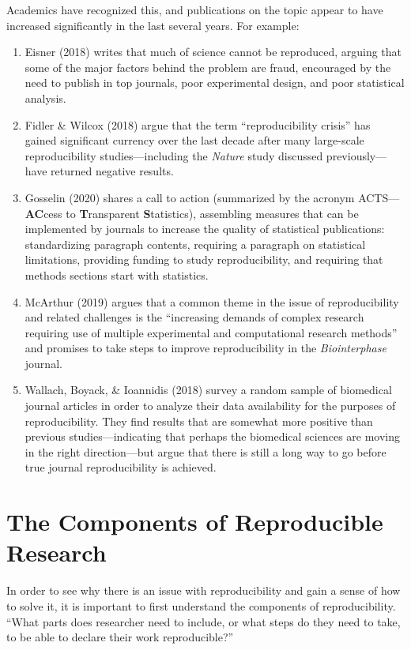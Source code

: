 \documentclass[12pt,twoside]{reedthesis}
\begin{document}
Academics have recognized this, and publications on the topic appear to have increased significantly in the last several years. For example:
\begin{enumerate}
\def\labelenumi{\arabic{enumi}.}
\item
  Eisner (2018) writes that much of science cannot be reproduced, arguing that some of the major factors behind the problem are fraud, encouraged by the need to publish in top journals, poor experimental design, and poor statistical analysis.
\item
  Fidler \& Wilcox (2018) argue that the term ``reproducibility crisis'' has gained significant currency over the last decade after many large-scale reproducibility studies---including the \emph{Nature} study discussed previously---have returned negative results.
\item
  Gosselin (2020) shares a call to action (summarized by the acronym ACTS---\textbf{AC}cess to \textbf{T}ransparent \textbf{S}tatistics), assembling measures that can be implemented by journals to increase the quality of statistical publications: standardizing paragraph contents, requiring a paragraph on statistical limitations, providing funding to study reproducibility, and requiring that methods sections start with statistics.
\item
  McArthur (2019) argues that a common theme in the issue of reproducibility and related challenges is the ``increasing demands of complex research requiring use of multiple experimental and computational research methods'' and promises to take steps to improve reproducibility in the \emph{Biointerphase} journal.
\item
  Wallach, Boyack, \& Ioannidis (2018) survey a random sample of biomedical journal articles in order to analyze their data availability for the purposes of reproducibility. They find results that are somewhat more positive than previous studies---indicating that perhaps the biomedical sciences are moving in the right direction---but argue that there is still a long way to go before true journal reproducibility is achieved.
\end{enumerate}
\hypertarget{the-components-of-reproducible-research}{%
\section{The Components of Reproducible Research}\label{the-components-of-reproducible-research}}

In order to see why there is an issue with reproducibility and gain a sense of how to solve it, it is important to first understand the components of reproducibility. ``What parts does researcher need to include, or what steps do they need to take, to be able to declare their work reproducible?''
\end{document}
